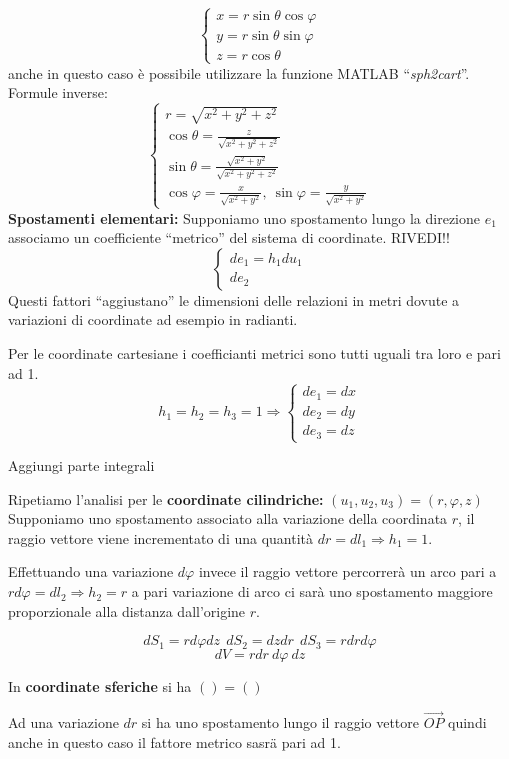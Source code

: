 $$
\begin{cases}
x = r\sin\theta\cos\varphi\\
y = r\sin\theta\sin\varphi\\
z = r\cos\theta
\end{cases}
$$
anche in questo caso è possibile utilizzare la funzione MATLAB ``\textit{sph2cart}''.
Formule inverse:
$$
\begin{cases}
r = \sqrt{x^2+y^2+z^2} \\
\cos\theta = \frac{z}{\sqrt{x^2+y^2+z^2}}\\
\sin\theta = \frac{\sqrt{x^2+y^2}}{\sqrt{x^2+y^2+z^2}} \\
\cos\varphi  = \frac{x}{\sqrt{x^2+y^2}},\ \sin\varphi = \frac{y}{\sqrt{x^2+y^2}}
\end{cases}
$$
\newpage
\textbf{Spostamenti elementari:}
Supponiamo uno spostamento lungo la direzione $e_1$ associamo un coefficiente ``metrico'' del 
sistema di coordinate. RIVEDI!!
$$
\begin{cases}
de_1 = h_1 du_1\\
de_2
\end{cases}
$$
Questi fattori ``aggiustano'' le dimensioni delle relazioni in metri dovute a variazioni di coordinate
ad esempio in radianti.

Per le coordinate cartesiane i coefficianti metrici sono tutti uguali tra loro e pari ad 1.
$$
h_1 = h_2 = h_3 = 1 \Rightarrow
\begin{cases}
de_1 = dx \\
de_2 = dy \\
de_3 = dz
\end{cases}
$$

Aggiungi parte integrali

Ripetiamo l'analisi per le \textbf{coordinate cilindriche:}
$ (u_1,u_2,u_3) = (r,\varphi,z)$
Supponiamo uno spostamento associato alla variazione della coordinata $r$, il raggio vettore
viene incrementato di una quantità $dr = dl_1 \Rightarrow h_1 =1$.

Effettuando una variazione $d\varphi$ invece il raggio vettore percorrerà un arco pari a $rd\varphi = dl_2 \Rightarrow h_2 = r$ a pari variazione di arco ci sarà uno spostamento maggiore proporzionale alla
distanza dall'origine $r$.

$$
dS_1 = rd\varphi dz\ \ dS_2 =dzdr\ \ dS_3 = rdrd\varphi
$$
$$
dV = rdr\ d\varphi\ dz
$$

In \textbf{coordinate sferiche} si ha $()=()$

Ad una variazione $dr$ si ha uno spostamento lungo il raggio vettore $\vec{OP}$ quindi anche in questo
caso il fattore metrico sasrä pari ad 1.

